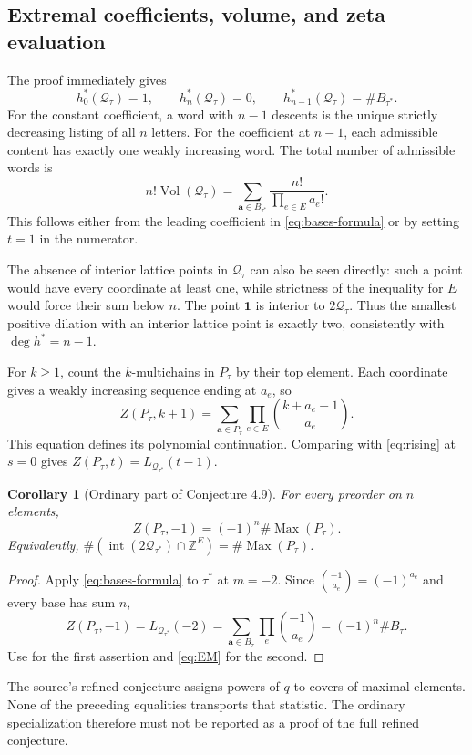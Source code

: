 \documentclass[11pt,letterpaper]{article}
\newtheorem{corollary}[corollary]{Corollary}
\theoremstyle{definition}
\newcommand{\Z}{\mathbb Z}
\newcommand{\one}{\mathbf 1}
\newcommand{\avec}{\mathbf a}
\newcommand{\QQ}{\mathcal Q}
\DeclareMathOperator{\Int}{int}
\DeclareMathOperator{\Max}{Max}
\DeclareMathOperator{\Vol}{Vol}
\begin{document}
\subsection{Extremal coefficients, volume, and zeta evaluation}
The proof immediately gives
\begin{equation}\label{eq:extremal}
 h_0^*(\QQ_\tau)=1,\qquad h_n^*(\QQ_\tau)=0,\qquad
 h_{n-1}^*(\QQ_\tau)=\#B_{\tau^*}.
\end{equation}
For the constant coefficient, a word with $n-1$ descents is the unique
strictly decreasing listing of all $n$ letters. For the coefficient at
$n-1$, each admissible content has exactly one weakly increasing word.
The total number of admissible words is
\begin{equation}\label{eq:volume}
 n!\Vol(\QQ_\tau)=\sum_{\avec\in B_{\tau^*}}
                          \frac{n!}{\prod_{e\in E}a_e!}.
\end{equation}
This follows either from the leading coefficient in
\eqref{eq:bases-formula} or by setting $t=1$ in the numerator.

The absence of interior lattice points in $\QQ_\tau$ can also be seen
directly: such a point would have every coordinate at least one, while
strictness of the inequality for $E$ would force their sum below $n$.
The point $\one$ is interior to $2\QQ_\tau$. Thus the smallest positive
dilation with an interior lattice point is exactly two, consistently with
$\deg h^*=n-1$.

For $k\geq1$, count the $k$-multichains in $P_\tau$ by their top element.
Each coordinate gives a weakly increasing sequence ending at $a_e$, so
\begin{equation}\label{eq:zeta}
 Z(P_\tau,k+1)=\sum_{\avec\in P_\tau}
                      \prod_{e\in E}\binom{k+a_e-1}{a_e}.
\end{equation}
This equation defines its polynomial continuation. Comparing with
\eqref{eq:rising} at $s=0$ gives
$Z(P_\tau,t)=L_{\QQ_{\tau^*}}(t-1)$.

\begin{corollary}[Ordinary part of Conjecture 4.9]\label{cor:zeta}
For every preorder on $n$ elements,
\begin{equation}\label{eq:zeta-minus-one}
 Z(P_\tau,-1)=(-1)^n\#\Max(P_\tau).
\end{equation}
Equivalently,
$\#(\Int(2\QQ_{\tau^*})\cap\Z^E)=\#\Max(P_\tau)$.
\end{corollary}
\begin{proof}
Apply \eqref{eq:bases-formula} to $\tau^*$ at $m=-2$. Since
$\binom{-1}{a_e}=(-1)^{a_e}$ and every base has sum $n$,
\[
 Z(P_\tau,-1)=L_{\QQ_{\tau^*}}(-2)
 =\sum_{\avec\in B_\tau}\prod_e\binom{-1}{a_e}
 =(-1)^n\#B_\tau.
\]
Use  for the first assertion and
\eqref{eq:EM} for the second.
\end{proof}
The source's refined conjecture assigns powers of $q$ to covers of maximal
elements. None of the preceding equalities transports that statistic. The
ordinary specialization therefore must not be reported as a proof of the
full refined conjecture.
\end{document}
